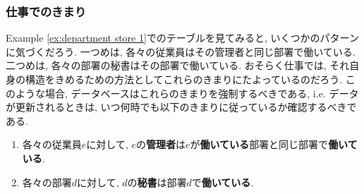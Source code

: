 
\subsubsection{仕事でのきまり}


Example \ref{ex:department store 1}でのテーブルを見てみると, いくつかのパターンに気づくだろう. 一つめは, 各々の従業員はその管理者と同じ部署で働いている. 二つめは, 各々の部署の秘書はその部署で働いている. おそらく仕事では, それ自身の構造をきめるための方法としてこれらのきまりにたよっているのだろう. このような場合, データベースはこれらのきまりを強制するべきである, i.e. データが更新されるときは, いつ何時でも以下のきまりに従っているか確認するべきである. 


\begin{enumerate}
\item 各々の従業員$e$に対して, $e$の\textbf{管理者}は$e$が\textbf{働いている}部署と同じ部署で\textbf{働いている}.
\item 各々の部署$d$に対して, $d$の\textbf{秘書}は部署$d$で\textbf{働いている}.
\end{enumerate}
\vspace{-.3in}\begin{align}\label{dia:rules}\end{align}\vspace{-.3in}

